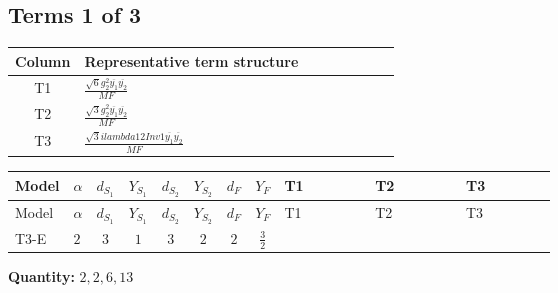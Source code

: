 \documentclass[8pt]{article}
\begin{document}
\begin{landscape}
\subsection*{Terms 1 of 3}
\begin{center}
\begin{tabular}{@{}c >{\raggedright\arraybackslash}p{0.82\linewidth}@{}}
\toprule
Column & Representative term structure \\
\midrule
T1 & \(\displaystyle \frac{\sqrt{6} g_{2}^{2} \overline{y_{1}} \overline{y_{2}}}{MF}\) \\
\midrule
T2 & \(\displaystyle \frac{\sqrt{3} g_{2}^{2} \overline{y_{1}} \overline{y_{2}}}{MF}\) \\
\midrule
T3 & \(\displaystyle \frac{\sqrt{3} i lambda12Inv1 \overline{y_{1}} \overline{y_{2}}}{MF}\) \\
\midrule
\bottomrule
\end{tabular}
\end{center}
\smallskip
\tiny
\begin{longtable}{@{}llcccccc >{\raggedright\arraybackslash}p{0.21\linewidth} >{\raggedright\arraybackslash}p{0.21\linewidth} >{\raggedright\arraybackslash}p{0.21\linewidth}@{}}
\toprule
Model & $\alpha$ & $d_{S_1}$ & $Y_{S_1}$ & $d_{S_2}$ & $Y_{S_2}$ & $d_F$ & $Y_F$ & T1 & T2 & T3 \\
\midrule
\endfirsthead
\toprule
Model & $\alpha$ & $d_{S_1}$ & $Y_{S_1}$ & $d_{S_2}$ & $Y_{S_2}$ & $d_F$ & $Y_F$ & T1 & T2 & T3 \\
\midrule
\endhead
T3-E & $2$ & $3$ & $1$ & $3$ & $2$ & $2$ & $\frac{3}{2}$ & \scriptsize\adjustbox{max width=\linewidth}{$\begin{gathered} \frac{\sqrt{6} g_{2}^{2} \overline{y_{1}} \overline{y_{2}}}{3 MF}\end{gathered}$} & \scriptsize\adjustbox{max width=\linewidth}{$\begin{gathered} \frac{\sqrt{3} g_{2}^{2} \overline{y_{1}} \overline{y_{2}}}{6 MF}\end{gathered}$} & \scriptsize\adjustbox{max width=\linewidth}{$\begin{gathered} - \frac{\sqrt{3} i lambda12Inv1 \overline{y_{1}} \overline{y_{2}}}{6 MF}\end{gathered}$} \\
\midrule
\bottomrule
\end{longtable}
\clearpage
\noindent\textbf{Quantity: }$\mathrm{2,2,6,13}$\par\smallskip

\end{landscape}
\end{document}
